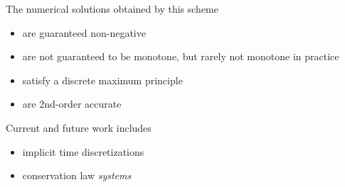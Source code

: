 The numerical solutions obtained by this scheme
\begin{itemize}
  \item are guaranteed non-negative
  \item are not guaranteed to be monotone, but rarely not monotone in practice
  \item satisfy a discrete maximum principle
  \item are 2nd-order accurate
\end{itemize}

Current and future work includes
\begin{itemize}
  \item implicit time discretizations
  \item conservation law \emph{systems}
\end{itemize}

